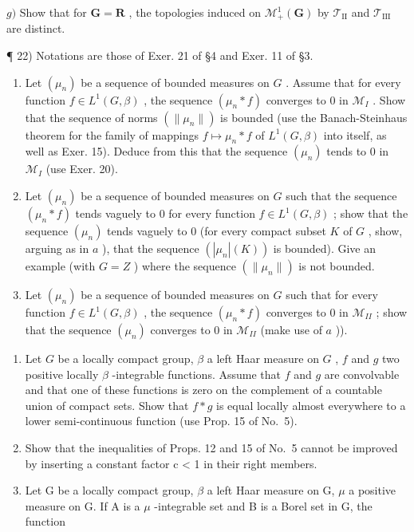 \(g)\) Show that for \(\mathbf{G} = \mathbf{R}\) , the topologies induced on \(\mathcal{M}_{+}^{1}(\mathbf{G})\) by \(\mathcal{T}_{\mathrm{II}}\) and \(\mathcal{T}_{\mathrm{III}}\) are distinct.

¶ 22) Notations are those of Exer. 21 of §4 and Exer. 11 of §3.

\begin{enumerate}
\def\labelenumi{\alph{enumi})}
\item
  Let \((\mu_n)\) be a sequence of bounded measures on \(G\) . Assume that for every function \(f \in L^1(G, \beta)\) , the sequence \((\mu_n * f)\) converges to 0 in \(\mathcal{M}_I\) . Show that the sequence of norms \((\|\mu_n\|)\) is bounded (use the Banach-Steinhaus theorem for the family of mappings \(f \mapsto \mu_n * f\) of \(L^1(G, \beta)\) into itself, as well as Exer. 15). Deduce from this that the sequence \((\mu_n)\) tends to 0 in \(\mathcal{M}_I\) (use Exer. 20).
\item
  Let \((\mu_n)\) be a sequence of bounded measures on \(G\) such that the sequence \((\mu_n * f)\) tends vaguely to 0 for every function \(f \in L^1(G, \beta)\) ; show that the sequence \((\mu_n)\) tends vaguely to 0 (for every compact subset \(K\) of \(G\) , show, arguing as in \(a\) ), that the sequence \((|\mu_n|(K))\) is bounded). Give an example (with \(G = Z\) ) where the sequence \((\|\mu_n\|)\) is not bounded.
\item
  Let \((\mu_n)\) be a sequence of bounded measures on \(G\) such that for every function \(f \in L^1(G, \beta)\) , the sequence \((\mu_n * f)\) converges to 0 in \(\mathcal{M}_{II}\) ; show that the sequence \((\mu_n)\) converges to 0 in \(\mathcal{M}_{II}\) (make use of \(a\) )).
\end{enumerate}

\begin{enumerate}
\def\labelenumi{\arabic{enumi})}
\setcounter{enumi}{22}
\item
  Let \(G\) be a locally compact group, \(\beta\) a left Haar measure on \(G\) , \(f\) and \(g\) two positive locally \(\beta\) -integrable functions. Assume that \(f\) and \(g\) are convolvable and that one of these functions is zero on the complement of a countable union of compact sets. Show that \(f * g\) is equal locally almost everywhere to a lower semi-continuous function (use Prop. 15 of No.~5).
\item
  Show that the inequalities of Props. 12 and 15 of No.~5 cannot be improved by inserting a constant factor c \textless{} 1 in their right members.
\item
  Let G be a locally compact group, \(\beta\) a left Haar measure on G, \(\mu\) a positive measure on G. If A is a \(\mu\) -integrable set and B is a Borel set in G, the function
\end{enumerate}

